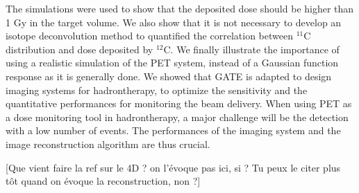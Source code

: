 \documentclass[11pt]{iopart}
\newcommand{\dsnote}[1]{{\color{green}[#1]}}
\begin{document}
The simulations were used to show that the deposited dose should be
higher than 1 Gy in the target volume. We also show that it is not
necessary to develop an isotope deconvolution method to quantified the
correlation between $^{11}$C distribution and dose deposited by
$^{12}$C. We finally illustrate the importance of using a realistic
simulation of the PET system, instead of a Gaussian function response
as it is generally done. We showed that GATE is adapted to design
imaging systems for hadrontherapy, to optimize the sensitivity and the
quantitative performances for monitoring the beam delivery. When using
PET as a dose monitoring tool in hadrontherapy, a major challenge will
be the detection with a low number of events. The performances of the
imaging system and the image reconstruction algorithm are thus
crucial.


\dsnote{Que vient faire la ref sur le 4D ? on l'évoque pas ici, si ?
  Tu peux le citer plus tôt quand on évoque la reconstruction, non ?}






%
%
~\\
%
%

%

\end{document}
